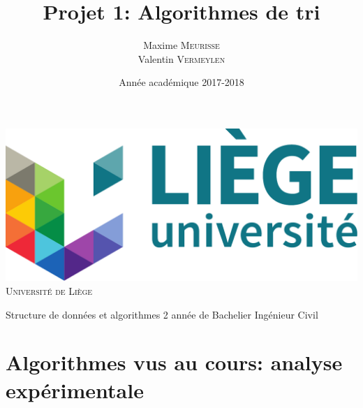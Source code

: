 \documentclass[a4paper, 12pt]{article}
\title{Projet 1: Algorithmes de tri}
\author{
	Maxime \textsc{Meurisse}\\Valentin \textsc{Vermeylen}\\
}
\date{Année académique 2017-2018}
\newcommand{\subtitle}{Structure de données et algorithmes}
\newcommand{\context}{2\ieme{} année de Bachelier Ingénieur Civil}
\begin{document}
	\makeatletter
	\begin{titlepage}
		\begin{minipage}[t][0.425\textheight][t]{\textwidth}
			\begin{center}
				\includegraphics[height=0.15\textheight]{resources/pdf/logo-uliege.pdf}
				\vfill
				{\huge \textsc{Université de Liège}}
				\vfill
			\end{center}
		\end{minipage}
		\vfill
		\begin{minipage}{\textwidth}
			\hspace{6pt}
			\begin{mdframed}[linewidth = 2pt, innertopmargin = 12pt, innerbottommargin = 12pt, leftline = false, rightline = false]
				\begin{center}
					{\huge \bfseries \@title}
				\end{center}
			\end{mdframed}
			\hspace{6pt}
		\end{minipage}
		\vfill
		\begin{minipage}[b][0.425\textheight][t]{\textwidth}
			\begin{center}
				{\LARGE \subtitle}
				\vfill
				{\large \@author\space}
				\vfill
				{\large \context \\[6pt] \@date}
			\end{center}
		\end{minipage}
	\end{titlepage}
	\makeatother
	\restoregeometry
	\section{Algorithmes vus au cours: analyse expérimentale}
\end{document}
